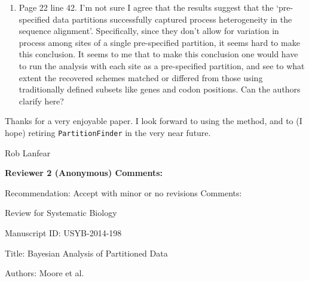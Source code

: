 \documentclass[10pt]{article}
\newcommand{\brmadd}[1]{{\color{blue}{#1}}}
\begin{document}
\begin{flushleft}
\begin{enumerate}
\medskip
\item{Page 22 line 42. I'm not sure I agree that the results suggest that the `pre-specified data partitions successfully captured process heterogeneity in the sequence alignment'. Specifically, since they don't allow for variation in process among sites of a single pre-specified partition, it seems hard to make this conclusion. It seems to me that to make this conclusion one would have to run the analysis with each site as a pre-specified partition, and see to what extent the recovered schemes matched or differed from those using traditionally defined subsets like genes and codon positions. Can the authors clarify here?}\\
\brmadd{Done.  This point was also raised by Mark (see his `Minor point 1', above), which we have addressed.} 
\end{enumerate}

Thanks for a very enjoyable paper. I look forward to using the method, and to (I hope) retiring \verb!PartitionFinder! in the very near future.

Rob Lanfear



\bigskip
\noindent\makebox[\linewidth]{\rule{6.5in}{0.4pt}}

\textbf{Reviewer 2 (Anonymous) Comments:}

\bigskip

Recommendation: Accept with minor or no revisions
\medskip
Comments:

\medskip
Review for Systematic Biology

\medskip
Manuscript ID:  USYB-2014-198

\medskip
Title: Bayesian Analysis of Partitioned Data

\medskip
Authors: Moore et al.


\end{flushleft}
\end{document}
